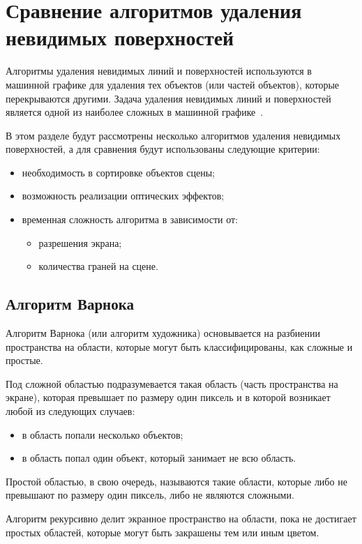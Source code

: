 \section{Сравнение алгоритмов удаления невидимых поверхностей}

Алгоритмы удаления невидимых линий и поверхностей используются в машинной графике для удаления тех объектов (или частей объектов), которые перекрываются другими. Задача удаления невидимых линий и поверхностей является одной из наиболее сложных в машинной графике~\cite{Rogers}.

В этом разделе будут рассмотрены несколько алгоритмов удаления невидимых поверхностей, а для сравнения будут использованы следующие критерии:
\begin{itemize}
    \item необходимость в сортировке объектов сцены;
    \item возможность реализации оптических эффектов;
    \item временная сложность алгоритма в зависимости от: \begin{itemize}
        \item разрешения экрана;
        \item количества граней на сцене.
    \end{itemize}
\end{itemize}

\subsection*{Алгоритм Варнока}

Алгоритм Варнока (или алгоритм художника) основывается на разбиении пространства на области, которые могут быть классифицированы, как сложные и простые.

Под сложной областью подразумевается такая область (часть пространства на экране), которая превышает по размеру один пиксель и в которой возникает любой из следующих случаев:
\begin{itemize}
    \item в область попали несколько объектов;
    \item в область попал один объект, который занимает не всю область.
\end{itemize}

Простой областью, в свою очередь, называются такие области, которые либо не превышают по размеру один пиксель, либо не являются сложными.

Алгоритм рекурсивно делит экранное пространство на области, пока не достигает простых областей, которые могут быть закрашены тем или иным цветом.

